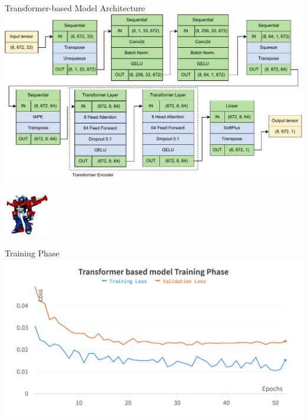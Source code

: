 \begin{frame}{Transformer-based Model Architecture}
	\centering
	\vspace{.5cm}
	\includegraphics[width=\textwidth]{sections/4_models/imgs/trans/transformer.pdf}

	\hfill
	\vspace{-1cm}
	\includegraphics[width=2cm]{sections/4_models/imgs/trans/trans.png}
\end{frame}


\begin{frame}{Training Phase}
	\centering
	\includegraphics[width=\textwidth]{sections/4_models/imgs/trans/gabtraining.png}
\end{frame}

